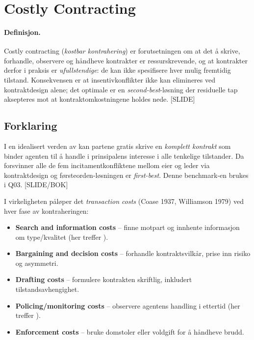 \section{Costly Contracting}\label{thr:costly-contracting}

\paragraph{Definisjon.} Costly contracting (\emph{kostbar kontrahering}) er forutsetningen om at det å skrive, forhandle, observere og håndheve kontrakter er ressurskrevende, og at kontrakter derfor i praksis er \emph{ufullstendige}: de kan ikke spesifisere hver mulig fremtidig tilstand. Konsekvensen er at insentivkonflikter ikke kan elimineres ved kontraktdesign alene; det optimale er en \emph{second-best}-løsning der residuelle tap aksepteres mot at kontraktomkostningene holdes nede. [SLIDE]

\subsection*{Forklaring}

I en idealisert verden av  kan partene gratis skrive en \emph{komplett kontrakt} som binder agenten til å handle i prinsipalens interesse i alle tenkelige tilstander. Da forsvinner alle de fem incitamentkonfliktene mellom eier og leder via kontraktdesign og førsteorden-løsningen er \emph{first-best}. Denne benchmark-en brukes i Q03. [SLIDE/BOK]

I virkeligheten påløper det \emph{transaction costs} (Coase 1937, Williamson 1979) ved hver fase av kontraheringen:
\begin{itemize}\setlength{\itemsep}{2pt}
\item \textbf{Search and information costs} -- finne motpart og innhente informasjon om type/kvalitet (her treffer ).
\item \textbf{Bargaining and decision costs} -- forhandle kontraktsvilkår, prise inn risiko og asymmetri.
\item \textbf{Drafting costs} -- formulere kontrakten skriftlig, inkludert tilstandsavhengighet.
\item \textbf{Policing/monitoring costs} -- observere agentens handling i ettertid (her treffer ).
\item \textbf{Enforcement costs} -- bruke domstoler eller voldgift for å håndheve brudd.
\end{itemize}

